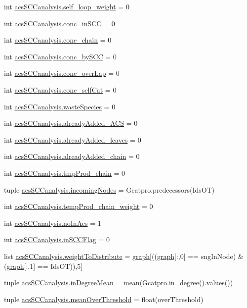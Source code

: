 \begin{DoxyCompactItemize}
\item 
int \hyperlink{a00102_ae9790fbc87f233c94224436a9cbd59c1}{acs\-S\-C\-Canalysis.\-self\-\_\-loop\-\_\-weight} = 0
\item 
int \hyperlink{a00102_a3fcb8f9c7e88b5c53f1201a383b38666}{acs\-S\-C\-Canalysis.\-conc\-\_\-in\-S\-C\-C} = 0
\item 
int \hyperlink{a00102_a3188cc39362e42ecb36d23a98f2b5a78}{acs\-S\-C\-Canalysis.\-conc\-\_\-chain} = 0
\item 
int \hyperlink{a00102_aac2f508d526d62bd7f9d4f5a5f8b1821}{acs\-S\-C\-Canalysis.\-conc\-\_\-by\-S\-C\-C} = 0
\item 
int \hyperlink{a00102_afd3169174539244248b78c8da2bba265}{acs\-S\-C\-Canalysis.\-conc\-\_\-over\-Lap} = 0
\item 
int \hyperlink{a00102_a9e8cc07f7d7f892f3f72274318dcbcef}{acs\-S\-C\-Canalysis.\-conc\-\_\-self\-Cat} = 0
\item 
int \hyperlink{a00102_ace0de61f3c6aa14b4197156be3a68280}{acs\-S\-C\-Canalysis.\-waste\-Species} = 0
\item 
int \hyperlink{a00102_a38f20e6b1cad6a61f1c9b87b37c76f63}{acs\-S\-C\-Canalysis.\-already\-Added\-\_\-\-A\-C\-S} = 0
\item 
int \hyperlink{a00102_ac842390795cf193351c795945cde8e77}{acs\-S\-C\-Canalysis.\-already\-Added\-\_\-leaves} = 0
\item 
int \hyperlink{a00102_ac1b286545469555eb284f9b5f2bd984f}{acs\-S\-C\-Canalysis.\-already\-Added\-\_\-chain} = 0
\item 
int \hyperlink{a00102_aee6b4f50387d471b70458cf703c0863b}{acs\-S\-C\-Canalysis.\-tmp\-Prod\-\_\-chain} = 0
\item 
tuple \hyperlink{a00102_a540ba5319ee67d8a2323099dad73ba36}{acs\-S\-C\-Canalysis.\-incoming\-Nodes} = Gcatpro.\-predecessors(Ids\-O\-T)
\item 
int \hyperlink{a00102_aaf17c99825e0961e4cfaa173ddfffe84}{acs\-S\-C\-Canalysis.\-temp\-Prod\-\_\-chain\-\_\-weight} = 0
\item 
int \hyperlink{a00102_a4766b3ca835449f1aa287fda699c7f96}{acs\-S\-C\-Canalysis.\-no\-In\-Acs} = 1
\item 
int \hyperlink{a00102_a6405b6b05e7b87812422cc30d2034904}{acs\-S\-C\-Canalysis.\-in\-S\-C\-C\-Flag} = 0
\item 
list \hyperlink{a00102_a5162bfbe5eb2618736d1f77bb3125a9b}{acs\-S\-C\-Canalysis.\-weight\-To\-Distribute} = \hyperlink{a00028_a2745e24fec2a44d51f4452beb1596bd3}{graph}\mbox{[}((\hyperlink{a00028_a2745e24fec2a44d51f4452beb1596bd3}{graph}\mbox{[}\-:,0\mbox{]} == sng\-In\-Node) \& (\hyperlink{a00028_a2745e24fec2a44d51f4452beb1596bd3}{graph}\mbox{[}\-:,1\mbox{]} == Ids\-O\-T)),5\mbox{]}
\item 
tuple \hyperlink{a00102_a5004d18b8cfa2803620a9cd7f32d9775}{acs\-S\-C\-Canalysis.\-in\-Degree\-Mean} = mean(Gcatpro.\-in\-\_\-degree().values())
\item 
tuple \hyperlink{a00102_af10c3623be709892f4bdc4df5a3d52b0}{acs\-S\-C\-Canalysis.\-mean\-Over\-Threshold} = float(over\-Threshold)
\end{DoxyCompactItemize}
